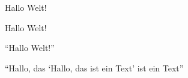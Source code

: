 \documentclass[12pt,ngerman]{scrartcl}
\begin{document}
\glq Hallo Welt!\grq

\glqq Hallo Welt!\grqq

\enquote{Hallo Welt!}


\enquote{Hallo, das \enquote{Hallo, das ist ein Text} ist ein Text}
\end{document}
